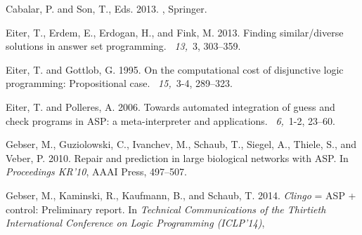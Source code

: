 \begin{thebibliography}{}
{\sc Cabalar, P.} {\sc and} {\sc Son, T.}, Eds. 2013.
,
Springer.

{\sc Eiter, T.}, {\sc Erdem, E.}, {\sc Erdogan, H.}, {\sc and} {\sc Fink, M.} 2013.
\newblock Finding similar/diverse solutions in answer set programming.
~{\em 13,\/}~3, 303--359.

{\sc Eiter, T.} {\sc and} {\sc Gottlob, G.} 1995.
\newblock On the computational cost of disjunctive logic programming: Propositional case.
~{\em 15,\/}~3-4, 289--323.

{\sc Eiter, T.} {\sc and} {\sc Polleres, A.} 2006.
\newblock Towards automated integration of guess and check programs in ASP: a meta-interpreter and applications.
~{\em 6,\/}~1-2, 23--60.

{\sc Gebser, M.}, {\sc Guziolowski, C.}, {\sc Ivanchev, M.}, {\sc Schaub, T.}, {\sc Siegel, A.}, {\sc Thiele, S.}, {\sc and} {\sc Veber, P.} 2010.
\newblock Repair and prediction in large biological networks with ASP.
\newblock In {\em Proceedings KR'10},
AAAI Press, 497--507.

{\sc Gebser, M.}, {\sc Kaminski, R.}, {\sc Kaufmann, B.}, {\sc and} {\sc Schaub, T.} 2014.
\newblock \textit{Clingo} = {ASP} + control: Preliminary report.
\newblock In {\em Technical Communications of the Thirtieth International Conference on Logic Programming (ICLP'14)}, 


\end{thebibliography}
